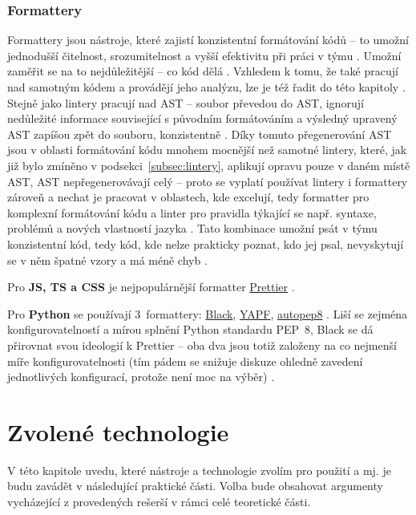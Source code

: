 \subsection{Formattery}

Formattery jsou nástroje, které zajistí konzistentní formátování kódů  -- to umožní jednodušší čitelnost, srozumitelnost a vyšší efektivitu při práci v týmu \cite{linter-medium1}. Umožní zaměřit se na to nejdůležitější -- co kód dělá \cite{linter-restishistory}. Vzhledem k tomu, že také pracují nad samotným kódem a provádějí jeho analýzu, lze je též řadit do této kapitoly \cite{linter-medium1}. Stejně jako lintery pracují nad AST -- soubor převedou do AST, ignorují nedůležité informace související s původním formátováním a výsledný upravený AST zapíšou zpět do souboru, konzistentně \cite{linter-medium1}. Díky tomuto přegenerování AST jsou v oblasti formátování kódu mnohem mocnější než samotné lintery, které, jak již bylo zmíněno v podsekci~\ref{subsec:lintery}, aplikují opravu pouze v daném místě AST, AST nepřegenerovávají celý -- proto se vyplatí používat lintery i formattery zároveň a nechat je pracovat v oblastech, kde excelují, tedy formatter pro komplexní formátování kódu a linter pro pravidla týkající se např. syntaxe, problémů a nových vlastností jazyka \cite{linter-medium2}. Tato kombinace umožní psát v týmu konzistentní kód, tedy kód, kde nelze prakticky poznat, kdo jej psal, nevyskytují se v něm špatné vzory a má méně chyb \cite{linter-restishistory}.

Pro \textbf{JS, TS a CSS} je nejpopulárnější formatter \href{https://prettier.io/}{Prettier} \cite{linter-medium1}. 

Pro \textbf{Python} se používají 3~formattery: \href{https://github.com/psf/black}{Black}, \href{https://github.com/google/yapf}{YAPF}, \href{https://github.com/hhatto/autopep8}{autopep8} \cite{formatter-python, linter-realpython}. Liší se zejména konfigurovatelností a mírou splnění Python standardu PEP~8, Black se dá přirovnat svou ideologií k Prettier -- oba dva jsou totiž založeny na co nejmenší míře konfigurovatelnosti (tím pádem se snižuje diskuze ohledně zavedení jednotlivých konfigurací, protože není moc na výběr) \cite{linter-realpython}.

\chapter{Zvolené technologie}\label{chap:zvolenetechnologie}

V této kapitole uvedu, které nástroje a technologie zvolím pro použití a mj. je budu zavádět v následující praktické části. Volba bude obsahovat argumenty vycházející z provedených rešerší v rámci celé teoretické části.


